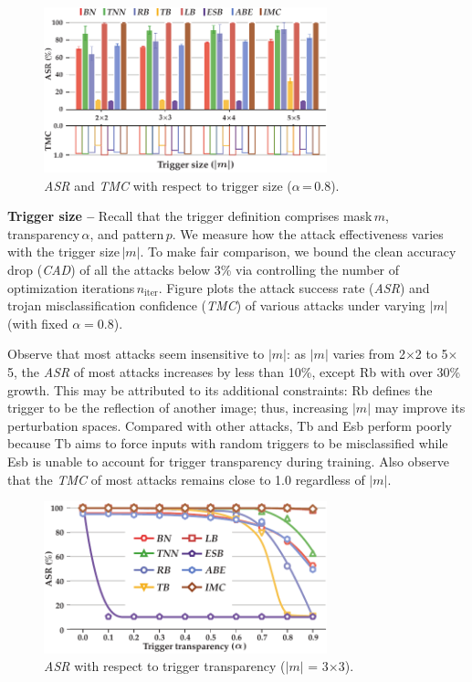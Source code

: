 \documentclass[compsoc,conference,a4paper,10pt,times]{IEEEtran}
\newcommand{\tb}{{\sc Tb}\xspace}
\newcommand{\esb}{{\sc Esb}\xspace}
\newcommand{\rfb}{{\sc Rb}\xspace}
\newcommand{\asr}{{\em \small ASR}\xspace}
\newcommand{\cad}{{\em \small CAD}\xspace}
\newcommand{\tmc}{{\em \small TMC}\xspace}
\begin{document}
\begin{figure}[!ht]
    \centering
    \includegraphics[width=82mm]{figures/asr-size-cifar-errorbar.pdf}
    \caption{\asr and \tmc with respect to trigger size ($\alpha$\,=\,0.8). \label{fig:size_cifar10}}
\end{figure}

\vspace{1pt}
{\bf Trigger size --} Recall that the trigger definition comprises mask\,$m$, transparency\,$\alpha$, and pattern\,$p$. We measure how the attack effectiveness varies with the trigger size\,$|m|$. To make fair comparison, we bound the clean accuracy drop (\cad) of all the attacks below 3\% via controlling the number of optimization iterations\,$n_{\mathrm{iter}}$. Figure plots the attack success rate (\asr) and trojan misclassification confidence (\tmc) of various attacks under varying $|m|$ (with fixed $\alpha = 0.8$). 

Observe that most attacks seem insensitive to $|m|$: as $|m|$ varies from 2$\times$2 to 5$\times$5, the \asr of most attacks increases by less than 10\%, except \rfb with over 30\% growth. This may be attributed to its additional constraints: \rfb defines the trigger to be the reflection of another image; thus, increasing $|m|$ may improve its perturbation spaces. Compared with other attacks, \tb and \esb perform poorly because \tb aims to force inputs with random triggers to be misclassified while \esb is unable to account for trigger transparency during training. 
Also observe that the \tmc of most attacks remains close to 1.0 regardless of $|m|$. 
    

\begin{figure}[!ht]
    \centering
    \includegraphics[width=82mm]{figures/asr-alpha-cifar.pdf}
    \caption{\asr with respect to trigger transparency ($|m|$ = 3$\times$3). \label{fig:alpha_cifar10}}
\end{figure}
\end{document}
